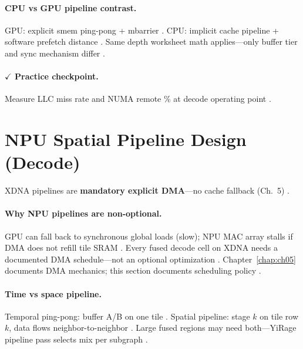 \paragraph{CPU vs GPU pipeline contrast.}
GPU: explicit smem ping-pong + mbarrier \citep{semianalysis2024tma,shah2024flashattention3}.
CPU: implicit cache pipeline + software prefetch distance \citep{dlbook,patel2025llminference}.
Same depth worksheet math applies---only buffer tier and sync mechanism differ \citep{yirage2026,chen2020compilerbasedhardw,taxbreak2026}.

\paragraph{$\checkmark$ Practice checkpoint.}
Measure LLC miss rate and NUMA remote \% at decode operating point \citep{patel2025llminference,taxbreak2026}.

\section{NPU Spatial Pipeline Design (Decode)}
\label{sec:ch08_npu_pipeline}

XDNA pipelines are \textbf{mandatory explicit DMA}---no cache fallback (Ch.~5) \citep{amd2024xdna,amd2024aie,yirage2026}.

\paragraph{Why NPU pipelines are non-optional.}
GPU can fall back to synchronous global loads (slow); NPU MAC array stalls if DMA does not refill tile SRAM \citep{amd2024aie,amd2024xdna,patel2025llminference}.
Every fused decode cell on XDNA needs a documented DMA schedule---not an optional optimization \citep{yirage2026,chen2020compilerbasedhardw,memoryfloor2026}.
Chapter~\ref{chap:ch05} documents DMA mechanics; this section documents scheduling policy \citep{amd2024xdna,taxbreak2026}.

\paragraph{Time vs space pipeline.}
Temporal ping-pong: buffer A/B on one tile \citep{amd2024aie,dao2022flashattention}.
Spatial pipeline: stage $k$ on tile row $k$, data flows neighbor-to-neighbor \citep{amd2024xdna,patel2025llminference}.
Large fused regions may need both---YiRage pipeline pass selects mix per subgraph \citep{yirage2026,wu2024mirage,chen2020compilerbasedhardw}.

